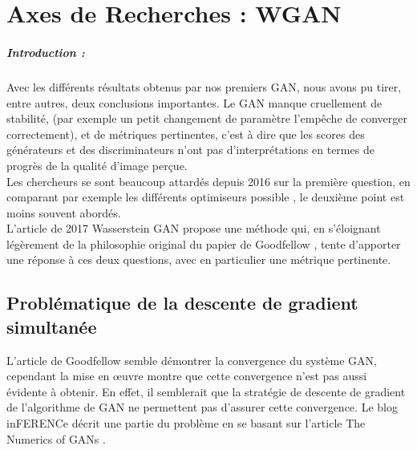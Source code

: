 

\chapter{Axes de Recherches : WGAN}

\paragraph*{Introduction : } Avec les différents résultats obtenus par nos premiers GAN, nous avons pu tirer, entre autres, deux conclusions importantes. Le GAN manque cruellement de stabilité, (par exemple un petit changement de paramètre l'empêche de converger correctement), et de métriques pertinentes, c'est à dire que les scores des générateurs et des discriminateurs n'ont pas d'interprétations en termes de progrès de la qualité d'image perçue.\\
Les chercheurs se sont beaucoup attardés depuis 2016 sur la première question, en comparant par exemple les différents optimiseurs possible \cite{optimiser}, le deuxième point est moins souvent abordés. \\
L'article de 2017 Wasserstein GAN \cite{wgan} propose une méthode qui, en s'éloignant légèrement de la philosophie original du papier de Goodfellow \cite{Goodfellow-et-al-2016}, tente d'apporter une réponse à ces deux questions, avec en particulier une métrique pertinente.

\section{Problématique de la descente de gradient simultanée}

L'article de Goodfellow semble démontrer la convergence du système GAN, cependant la mise en œuvre montre que cette convergence n'est pas aussi évidente à obtenir. En effet, il semblerait que la stratégie de descente de gradient de l'algorithme de GAN ne permettent pas d'assurer cette convergence. Le blog inFERENCe \cite{conservative-field} décrit une partie du problème en se basant sur l'article The Numerics of GANs \cite{numerics-gan}.

